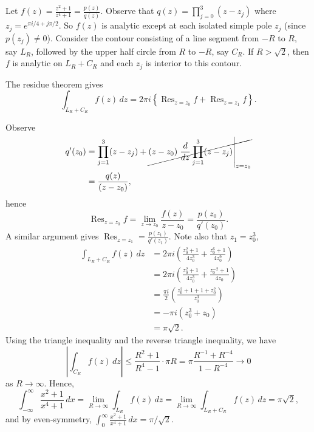 \documentclass{homework}
\DeclareMathOperator*{\Res}{Res}
\begin{document}
\begin{solution}
Let $f(z) = \frac{z^2+1}{z^4+1} = \frac{p(z)}{q(z)}$.  Observe that $q(z) = \prod_{j=0}^3(z-z_j)$ where $z_j = e^{\pi i/4 + j\pi/2}$.  So $f(z)$ is analytic except at each isolated simple pole $z_j$ (since $p(z_j) \not= 0$).  Consider the contour consisting of a line segment from $-R$ to $R$, say $L_R$, followed by the upper half circle from $R$ to $-R$, say $C_R$.  If $R> \sqrt 2$, then $f$ is analytic on $L_R + C_R$ and each $z_j$ is interior to this contour.

  \begin{center}
  \end{center}

The residue theorem gives 
$$
  \int_{L_R + C_R} f(z)\,dz = 2\pi i\left\{\Res_{z=z_0} f + \Res_{z=z_1} f\right\}.
$$

Observe
\begin{align*}
q'(z_0) 
  &=  \prod_{j=1}^3(z-z_j) + \cancel{(z-z_0)\left.\frac{d}{dz}\prod_{j=1}^3(z-z_j)\right|_{z=z_0}}\\
  &=  \frac{q(z)}{(z-z_0)},
\end{align*}
hence 
$$
\Res_{z=z_0} f = \lim_{z\to z_0} \frac{f(z)}{z-z_0} = \frac{p(z_0)}{q'(z_0)}.
$$
A similar argument gives $\Res_{z=z_1} = \frac{p(z_1)}{q'(z_1)}$.  Note also that $z_1 = z_0^3$,
\begin{align*}
  \int_{L_R + C_R} f(z)\,dz 
  &= 2\pi i\left( \frac {z_0^2 + 1}{4z_0^3} + \frac{z_0^6 + 1}{4z_0^9} \right)\\
  &= 2\pi i\left( \frac {z_0^2 + 1}{4z_0^3} + \frac{z_0^{-2} + 1}{4z_0} \right)\\
  &= \frac{\pi i}{2}\left( \frac {z_0^2 + 1 + 1 + z_0^2}{z_0^3}\right)\\
  &= -\pi i\left( z_0^3 + z_0\right)\\
  &= \pi \sqrt 2.
\end{align*}
Using the triangle inequality and the reverse triangle inequality, we have
$$
  \left|\int_{C_R} f(z)\,dz\right| \le \frac{R^2+1}{R^4-1}\cdot \pi R = \pi \frac{R^{-1} + R^{-4}}{1 - R^{-4}}\to 0
$$
as $R\to \infty$.  Hence,
$$
  \int_{-\infty}^\infty \frac{x^2+1}{x^4+1}\,dx 
  = \lim_{R\to \infty} \int_{L_R} f(z)\,dz 
  = \lim_{R\to \infty} \int_{L_R + C_R} f(z)\,dz
  = \pi\sqrt 2,
$$
and by even-symmetry, $\int_0^\infty \frac{x^2+1}{x^4+1}\,dx = \pi/\sqrt 2$.
\end{solution}
\end{document}
